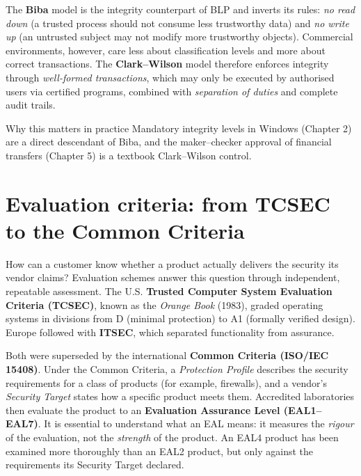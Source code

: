 The \textbf{Biba} model is the integrity counterpart of BLP and inverts its rules: \emph{no read down} (a trusted process should not consume less trustworthy data) and \emph{no write up} (an untrusted subject may not modify more trustworthy objects). Commercial environments, however, care less about classification levels and more about correct transactions. The \textbf{Clark–Wilson} model therefore enforces integrity through \emph{well-formed transactions}, which may only be executed by authorised users via certified programs, combined with \emph{separation of duties} and complete audit trails.

\begin{notebox}{Why this matters in practice}
Mandatory integrity levels in Windows (Chapter 2) are a direct descendant of Biba, and the maker–checker approval of financial transfers (Chapter 5) is a textbook Clark–Wilson control.
\end{notebox}

\section{Evaluation criteria: from TCSEC to the Common Criteria}\label{sec:1.8}
How can a customer know whether a product actually delivers the security its vendor claims? Evaluation schemes answer this question through independent, repeatable assessment. The U.S. \textbf{Trusted Computer System Evaluation Criteria (TCSEC)}, known as the \emph{Orange Book} (1983), graded operating systems in divisions from D (minimal protection) to A1 (formally verified design). Europe followed with \textbf{ITSEC}, which separated functionality from assurance.

Both were superseded by the international \textbf{Common Criteria (ISO/IEC 15408)}. Under the Common Criteria, a \emph{Protection Profile} describes the security requirements for a class of products (for example, firewalls), and a vendor's \emph{Security Target} states how a specific product meets them. Accredited laboratories then evaluate the product to an \textbf{Evaluation Assurance Level (EAL1–EAL7)}. It is essential to understand what an EAL means: it measures the \emph{rigour} of the evaluation, not the \emph{strength} of the product. An EAL4 product has been examined more thoroughly than an EAL2 product, but only against the requirements its Security Target declared.

